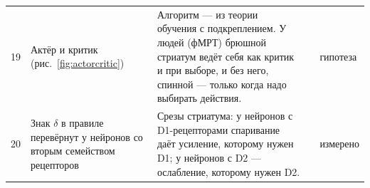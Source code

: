 {\begin{longtable}{>{\raggedright}p{0.5cm}>{\raggedright}p{4.0cm}>{\raggedright}p{5.6cm}>{\raggedright}p{2.3cm}>{\raggedright\arraybackslash}p{1.7cm}}
19 & Актёр и критик (рис.~\ref{fig:actorcritic}) & Алгоритм --- из теории обучения с подкреплением. У людей (фМРТ) брюшной стриатум ведёт себя как критик и при выборе, и без него, спинной --- только когда надо выбирать действия. & \cite{SuttonBarto2018, ODoherty2004actor} & гипотеза \\
20 & Знак $\delta$ в правиле перевёрнут у нейронов со вторым семейством рецепторов & Срезы стриатума: у нейронов с D1-рецепторами спаривание даёт усиление, которому нужен D1; у нейронов с D2 --- ослабление, которому нужен D2. & \cite{Shen2008} & измерено \\
\bottomrule
\end{longtable}}
